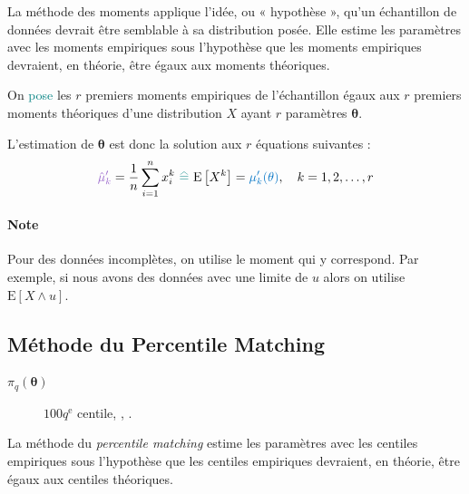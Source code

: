 \documentclass[french]{article}
\begin{document}
\begin{multicols*}{2}
\begin{definitionNOHFILL}
\begin{rappel_enhanced}[Contexte]
La méthode des moments applique l'idée, ou « hypothèse », qu'un échantillon de données devrait être semblable à sa distribution posée. Elle estime les paramètres avec les moments empiriques sous l'hypothèse que les moments empiriques devraient, en théorie, être égaux aux moments théoriques.
\end{rappel_enhanced}

On \textcolor{teal}{pose} les $r$ premiers \textcolor{amethyst}{moments empiriques} de l'échantillon égaux aux $r$ premiers \textcolor{trueblue}{moments théoriques} d'une distribution $X$ ayant $r$ paramètres $\bm{\theta}$. 

\bigskip

L'estimation de $\bm{\theta}$ est donc la solution aux $r$ équations suivantes : 
\begin{equation*}
	\textcolor{amethyst}{\hat{\mu}_{k}'} 
	=	\frac{1}{n}\sum_{i = 1}^{n} x_{i}^{k}\
	\textcolor{teal}{\equalhat}\	\esp{X^{k}}
	=	\textcolor{trueblue}{\mu_{k}'(\theta)}, \quad	k = 1, 2, \dots, r
\end{equation*}
\end{definitionNOHFILL}

\paragraph{Note}	Pour des données incomplètes, on utilise le moment qui y correspond. Par exemple, si nous avons des données avec une limite de $u$ alors on utilise $\text{E}[X \wedge u]$.



\columnbreak
\subsection{Méthode du \guillemotleft Percentile Matching \guillemotright}\label{subsec:percMatching}
\begin{distributions}[Notation]
\begin{description}
	\item[$\pi_{q}(\bm{\theta})$]	$100q^{\text{e}}$ centile, , .
\end{description}
\end{distributions}

\begin{definitionNOHFILL}[Méthode du \og \textit{percentile matching} \fg{}]
\begin{rappel_enhanced}[Contexte]
La méthode du \og \textit{percentile matching} \fg{} estime les paramètres avec les centiles empiriques sous l'hypothèse que les centiles empiriques devraient, en théorie, être égaux aux centiles théoriques.


\end{rappel_enhanced}
\end{definitionNOHFILL}
\end{multicols*}
\end{document}
